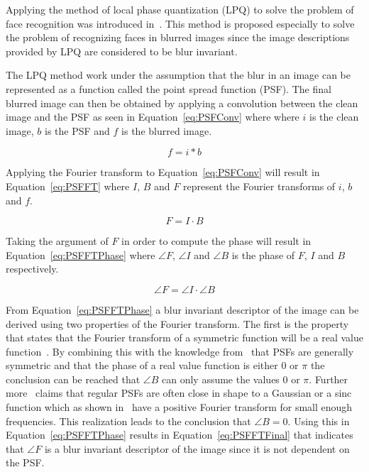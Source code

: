 Applying the method of local phase quantization (LPQ) to solve the problem of face recognition was introduced in~\cite{LPQ:1996}. This method is proposed especially to solve the problem of recognizing faces in blurred images since the image descriptions provided by LPQ are considered to be blur invariant.

The LPQ method work under the assumption that the blur in an image can be represented as a function called the point spread function (PSF). The final blurred image can then be obtained by applying a convolution between the clean image and the PSF as seen in Equation~\ref{eq:PSFConv} where where \(i\) is the clean image, \(b\) is the PSF and \(f\) is the blurred image.

\begin{equation}
  f = i \ast b
\label{eq:PSFConv}
\end{equation}

Applying the Fourier transform to Equation~\ref{eq:PSFConv} will result in Equation~\ref{eq:PSFFT} where \(I\), \(B\) and \(F\) represent the Fourier transforms of \(i\), \(b\) and \(f\).

\begin{equation}
  F = I \cdot B
\label{eq:PSFFT}
\end{equation}

Taking the argument of \(F\) in order to compute the phase will result in Equation~\ref{eq:PSFFTPhase} where \(\angle F\), \(\angle I\) and \(\angle B\) is the phase of \(F\), \(I\) and \(B\) respectively.

\begin{equation}
  \angle F = \angle I \cdot \angle B
\label{eq:PSFFTPhase}
\end{equation}

From Equation~\ref{eq:PSFFTPhase} a blur invariant descriptor of the image can be derived using two properties of the Fourier transform. The first is the property that states that the Fourier transform of a symmetric function will be a real value function~\cite[p. 151]{FandLTransforms}. By combining this with the knowledge from~\cite{PSFSymmetry} that PSFs are generally symmetric and that the phase of a real value function is either \(0\) or \(\pi\) the conclusion can be reached that \(\angle B\) can only assume the values \(0\) or \(\pi\). Further more~\cite{LPQ:1996} claims that regular PSFs are often close in shape to a Gaussian or a sinc function which as shown in~\cite[p. 144-148]{FandLTransforms} have a positive Fourier transform for small enough frequencies. This realization leads to the conclusion that \(\angle B = 0\). Using this in Equation~\ref{eq:PSFFTPhase} results in Equation~\ref{eq:PSFFTFinal} that indicates that \(\angle F\) is a blur invariant descriptor of the image since it is not dependent on the PSF.

